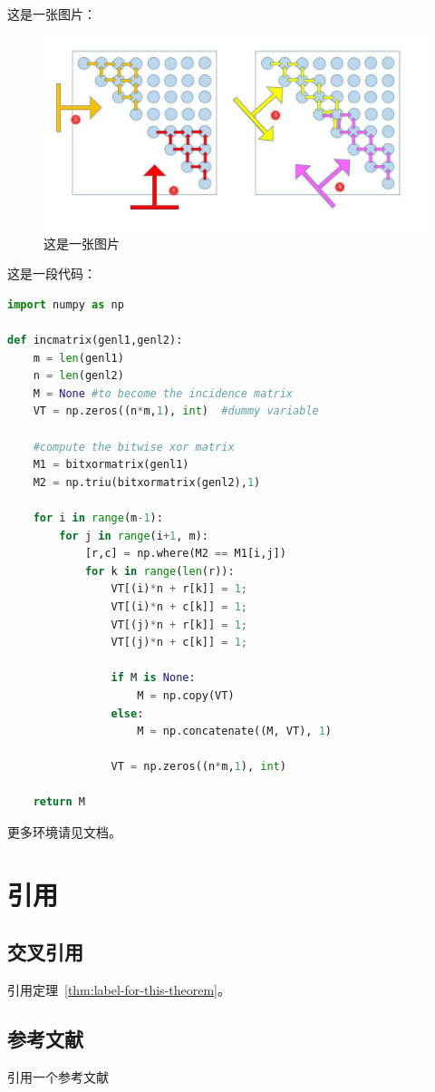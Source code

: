 这是一张图片：

\begin{figure}[hbt]
  \centering
  \includegraphics{image/dynamic-programming-1.png}
  \caption{这是一张图片}\label{fig:example}
\end{figure}

这是一段代码：

\begin{lstlisting}[language=Python, caption=Python example]
import numpy as np

def incmatrix(genl1,genl2):
    m = len(genl1)
    n = len(genl2)
    M = None #to become the incidence matrix
    VT = np.zeros((n*m,1), int)  #dummy variable

    #compute the bitwise xor matrix
    M1 = bitxormatrix(genl1)
    M2 = np.triu(bitxormatrix(genl2),1)

    for i in range(m-1):
        for j in range(i+1, m):
            [r,c] = np.where(M2 == M1[i,j])
            for k in range(len(r)):
                VT[(i)*n + r[k]] = 1;
                VT[(i)*n + c[k]] = 1;
                VT[(j)*n + r[k]] = 1;
                VT[(j)*n + c[k]] = 1;

                if M is None:
                    M = np.copy(VT)
                else:
                    M = np.concatenate((M, VT), 1)

                VT = np.zeros((n*m,1), int)

    return M
\end{lstlisting}

更多环境请见文档。

\section{引用}

\subsection{交叉引用}

引用定理~\ref{thm:label-for-this-theorem}。

\subsection{参考文献}

引用一个参考文献~\cite{cormen2009introduction}
